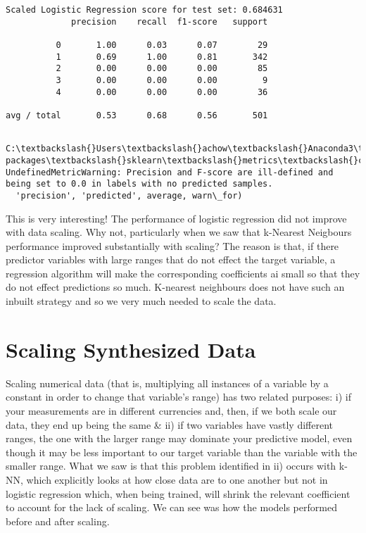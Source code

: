 \documentclass[11pt]{article}
\begin{document}
    \begin{Verbatim}[commandchars=\\\{\}]
Scaled Logistic Regression score for test set: 0.684631
             precision    recall  f1-score   support

          0       1.00      0.03      0.07        29
          1       0.69      1.00      0.81       342
          2       0.00      0.00      0.00        85
          3       0.00      0.00      0.00         9
          4       0.00      0.00      0.00        36

avg / total       0.53      0.68      0.56       501


    \end{Verbatim}

    \begin{Verbatim}[commandchars=\\\{\}]
C:\textbackslash{}Users\textbackslash{}achow\textbackslash{}Anaconda3\textbackslash{}lib\textbackslash{}site-packages\textbackslash{}sklearn\textbackslash{}metrics\textbackslash{}classification.py:1135: UndefinedMetricWarning: Precision and F-score are ill-defined and being set to 0.0 in labels with no predicted samples.
  'precision', 'predicted', average, warn\_for)

    \end{Verbatim}

    This is very interesting! The performance of logistic regression did not
improve with data scaling. Why not, particularly when we saw that
k-Nearest Neigbours performance improved substantially with scaling? The
reason is that, if there predictor variables with large ranges that do
not effect the target variable, a regression algorithm will make the
corresponding coefficients ai small so that they do not effect
predictions so much. K-nearest neighbours does not have such an inbuilt
strategy and so we very much needed to scale the data.

    \section{Scaling Synthesized Data}\label{scaling-synthesized-data}

Scaling numerical data (that is, multiplying all instances of a variable
by a constant in order to change that variable's range) has two related
purposes: i) if your measurements are in different currencies and, then,
if we both scale our data, they end up being the same \& ii) if two
variables have vastly different ranges, the one with the larger range
may dominate your predictive model, even though it may be less important
to our target variable than the variable with the smaller range. What we
saw is that this problem identified in ii) occurs with k-NN, which
explicitly looks at how close data are to one another but not in
logistic regression which, when being trained, will shrink the relevant
coefficient to account for the lack of scaling. We can see was how the
models performed before and after scaling.
\end{document}
